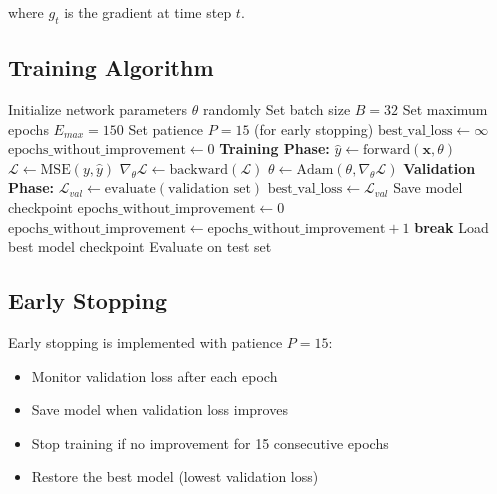 \documentclass[12pt,a4paper]{article}
\begin{document}
where $g_t$ is the gradient at time step $t$.

\subsection{Training Algorithm}

\begin{algorithm}[H]
\caption{Neural Network Training Procedure}
\begin{algorithmic}[1]
\State Initialize network parameters $\theta$ randomly
\State Set batch size $B = 32$
\State Set maximum epochs $E_{max} = 150$
\State Set patience $P = 15$ (for early stopping)
\State $\text{best\_val\_loss} \leftarrow \infty$
\State $\text{epochs\_without\_improvement} \leftarrow 0$
    \State \textbf{Training Phase:}
        \State $\hat{y} \leftarrow \text{forward}(\mathbf{x}, \theta)$ 
        \State $\mathcal{L} \leftarrow \text{MSE}(y, \hat{y})$ 
        \State $\nabla_\theta \mathcal{L} \leftarrow \text{backward}(\mathcal{L})$ 
        \State $\theta \leftarrow \text{Adam}(\theta, \nabla_\theta \mathcal{L})$ 
    \EndFor
    \State \textbf{Validation Phase:}
    \State $\mathcal{L}_{val} \leftarrow \text{evaluate}(\text{validation set})$
        \State $\text{best\_val\_loss} \leftarrow \mathcal{L}_{val}$
        \State Save model checkpoint
        \State $\text{epochs\_without\_improvement} \leftarrow 0$
    \Else
        \State $\text{epochs\_without\_improvement} \leftarrow \text{epochs\_without\_improvement} + 1$
    \EndIf
        \State \textbf{break} 
    \EndIf
\EndFor
\State Load best model checkpoint
\State Evaluate on test set
\end{algorithmic}
\end{algorithm}

\subsection{Early Stopping}

Early stopping is implemented with patience $P = 15$:

\begin{itemize}
    \item Monitor validation loss after each epoch
    \item Save model when validation loss improves
    \item Stop training if no improvement for 15 consecutive epochs
    \item Restore the best model (lowest validation loss)
\end{itemize}
\end{document}
